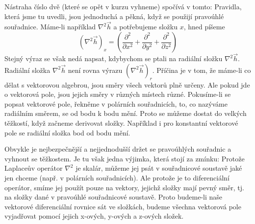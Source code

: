     Nástraha číslo dvě (které se opět v kurzu vyhneme) spočívá v tomto: Pravidla, která jsme tu uvedli, 
    jsou jednoduchá a pěkná, když se použijí pravoúhlé souřadnice. Máme-li například \(\nabla^2\vec{h}\) a 
    potřebujeme složku \(x\), hned píšeme
    \begin{equation*}
      (\nabla^2\vec{h})_x = \left(\frac{\partial^2}{\partial x^2} + 
                                  \frac{\partial^2}{\partial y^2} + 
                                  \frac{\partial^2}{\partial z^2} \right)
    \end{equation*}
    Stejný výraz se však nedá napsat, kdybychom se ptali na radiální složku \(\nabla^2\vec{h}\). Radiální 
    složka \(\nabla^2\vec{h}\) není rovna výrazu \((\nabla^2\vec{h})_r\). Příčina je v tom, že máme-li co 
    dělat s vektorovou algebrou, jsou směry všech vektorů plně určeny. Ale pokud jde o vektorová pole, jsou 
    jejich směry v různých místech různé. Pokusíme-li se popsat vektorové pole, řekněme v polárních 
    souřadnicích, to, co nazýváme radiálním směrem, se od bodu k bodu mění. Proto se můžeme dostat do 
    velkých těžkostí, když začneme derivovat složky. Například i pro konstantní vektorové pole se radiální 
    složka bod od bodu mění.

    Obvykle je nejbezpečnější a nejjednodušší držet se pravoúhlých souřadnic a vyhnout se těžkostem. Je tu 
    však jedna výjimka, která stojí za zmínku: Protože Laplaceův operátor \(\nabla^2\) je skalár, můžeme 
    jej psát v souřadnicové soustavě jaké jen chceme (např. v polárních souřadnicích). Ale protože je to 
    diferenciální operátor, smíme jej použít pouze na vektory, jejichž složky mají pevný směr, tj. na složky 
    dané v pravoúhlé souřadnicové soustavě. Proto budeme-li naše vektorové diferenciální rovnice sát ve 
    složkách, budeme všechna vektorová pole vyjadřovat pomocí jejich x-ových, y-ových a z-ových složek.
      
\printbibliography[heading=subbibliography]  